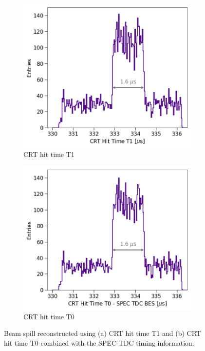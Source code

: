 \begin{figure}[hb!]
\begin{subfigure}[h]{0.495\linewidth}
\centering    
\includegraphics[width=\linewidth]{CRT_T1_TopHat}
\caption{CRT hit time T1}
\label{fig:topHat_T1}
\end{subfigure}%
\hfill
\begin{subfigure}[h]{0.495\linewidth}
\centering    
\includegraphics[width=\linewidth]{CRTT0_SPEC_TopHat}
\caption{CRT hit time T0}
\label{fig:topHat_T0}
\end{subfigure}
\caption[Reconstructed Beam Spill Using CRT Sharps]{
Beam spill reconstructed using (a) CRT hit time T1 and (b) CRT hit time T0 combined with the SPEC-TDC timing information. 
}
\label{fig:topHat}
\end{figure}



